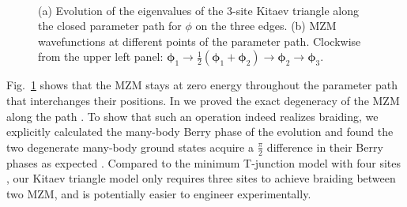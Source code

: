 \documentclass[aps,prb,twocolumn,showpacs,amsmath,amssymb,superscriptaddress]{revtex4-2}
\begin{document}
\begin{figure}[ht]
	\centering
  \hspace{-18pt}
  \\
	\caption{(a) Evolution of the eigenvalues of the 3-site Kitaev triangle along the closed parameter path for $\phi$ on the three edges. (b) MZM wavefunctions at different points of the parameter path. Clockwise from the upper left panel: $\bm \phi_1 \rightarrow \frac{1}{2}(\bm \phi_1 + \bm \phi_2)\rightarrow \bm \phi_2\rightarrow \bm \phi_3$.}
	\label{fig:3eig}
\end{figure}

Fig.~\ref{fig:3eig} shows that the MZM stays at zero energy throughout the parameter path that interchanges their positions. In \cite{supp} we proved the exact degeneracy of the MZM along the path \cite{FU_2021}. To show that such an operation indeed realizes braiding, we explicitly calculated the many-body Berry phase of the evolution \cite{supp,aliceaNonAbelianStatisticsTopological2011,liManipulatingMajoranaZero2016} and found the two degenerate many-body ground states acquire a $\frac{\pi}{2}$ difference in their Berry phases as expected \cite{aliceaNonAbelianStatisticsTopological2011}. Compared to the minimum T-junction model with four sites \cite{aliceaNonAbelianStatisticsTopological2011,Pandey_2023}, our Kitaev triangle model only requires three sites to achieve braiding between two MZM, and is potentially easier to engineer experimentally.
\end{document}
